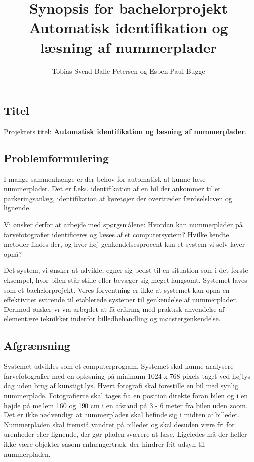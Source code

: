 \documentclass[12pt,a4paper,final]{report}
\author{Tobias Svend Balle-Petersen og Esben Paul Bugge}
\title{Synopsis for bachelorprojekt\\\large{Automatisk identifikation og læsning af nummerplader}}
\begin{document}
\maketitle
\newpage

\subsection*{Titel}
Projektets titel: \textbf{Automatisk identifikation og læsning af nummerplader}.
\subsection*{Problemformulering}
I mange sammenhænge er der behov for automatisk at kunne læse nummerplader. Det er f.eks. identifikation af en bil der ankommer til et parkeringsanlæg, identifikation af køretøjer der overtræder færdselsloven og lignende.

Vi ønsker derfor at arbejde med spørgsmålene: Hvordan kan nummerplader på farvefotografier identificeres og læses af et computersystem? Hvilke kendte metoder findes der, og hvor høj genkendelsesprocent kan et system vi selv laver opnå?

Det system, vi ønsker at udvikle, egner sig bedst til en situation som i det første eksempel, hvor bilen står stille eller bevæger sig meget langsomt. Systemet laves som et bachelorprojekt. Vores forventning er ikke at systemet kan opnå en effektivitet svarende til etablerede systemer til genkendelse af nummerplader. Derimod ønsker vi via arbejdet at få erfaring med praktisk anvendelse af elementære teknikker indenfor billedbehandling og mønstergenkendelse.


\subsection*{Afgrænsning}
Systemet udvikles som et computerprogram. Systemet skal kunne analysere farvefotografier med en opløsning på minimum 1024 x 768 pixels taget ved højlys dag uden brug af kunstigt lys. Hvert fotografi skal forestille en bil med synlig nummerplade. Fotografierne skal tages fra en position direkte foran bilen og i en højde på mellem 160 og 190 cm i en afstand på 3 - 6 meter fra bilen uden zoom. Det er ikke nødvendigt at nummerpladen skal befinde sig i midten af billedet. Nummerpladen skal fremstå vandret på billedet og skal desuden være fri for urenheder eller lignende, der gør pladen sværere at læse. Ligeledes må der heller ikke være objekter såsom anhængertræk, der hindrer frit udsyn til nummerpladen.
\end{document}
